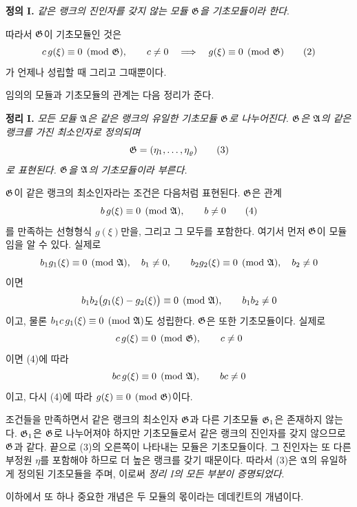 \medskip
\noindent\textbf{정의 I.} \emph{같은 랭크의 진인자를 갖지 않는 모듈 \(\mathfrak G\)을 기초모듈이라 한다}.

따라서 \(\mathfrak G\)이 기초모듈인 것은
\begin{equation}
c\,g(\xi)\equiv0\pmod{\mathfrak G},\qquad c\ne0
\quad\Longrightarrow\quad g(\xi)\equiv0\pmod{\mathfrak G}
\tag{2}
\end{equation}
가 언제나 성립할 때 그리고 그때뿐이다.

임의의 모듈과 기초모듈의 관계는 다음 정리가 준다.

\medskip
\noindent\textbf{정리 I.} \emph{모든 모듈 \(\mathfrak A\)은 같은 랭크의 유일한 기초모듈 \(\mathfrak G\)로 나누어진다. \(\mathfrak G\)은 \(\mathfrak A\)의 같은 랭크를 가진 최소인자로 정의되며
\begin{equation}
\mathfrak G=(\eta_1,\ldots,\eta_\varrho)
\tag{3}
\end{equation}
로 표현된다. \(\mathfrak G\)을 \(\mathfrak A\)의 기초모듈이라 부른다.}

\(\mathfrak G\)이 같은 랭크의 최소인자라는 조건은 다음처럼 표현된다. \(\mathfrak G\)은 관계
\begin{equation}
b\,g(\xi)\equiv0\pmod{\mathfrak A},\qquad b\ne0
\tag{4}
\end{equation}
를 만족하는 선형형식 \(g(\xi)\)만을, 그리고 그 모두를 포함한다. 여기서 먼저 \(\mathfrak G\)이 모듈임을 알 수 있다. 실제로
\[
b_1g_1(\xi)\equiv0\pmod{\mathfrak A},\quad b_1\ne0,\qquad
b_2g_2(\xi)\equiv0\pmod{\mathfrak A},\quad b_2\ne0
\]
이면
\[
b_1b_2\bigl(g_1(\xi)-g_2(\xi)\bigr)\equiv0\pmod{\mathfrak A},
\qquad b_1b_2\ne0
\]
이고, 물론 \(b_1c\,g_1(\xi)\equiv0\pmod{\mathfrak A}\)도 성립한다. \(\mathfrak G\)은 또한 기초모듈이다. 실제로
\[
c\,g(\xi)\equiv0\pmod{\mathfrak G},\qquad c\ne0
\]
이면 (4)에 따라
\[
bc\,g(\xi)\equiv0\pmod{\mathfrak A},\qquad bc\ne0
\]
이고, 다시 (4)에 따라 \(g(\xi)\equiv0\pmod{\mathfrak G}\)이다.

조건들을 만족하면서 같은 랭크의 최소인자 \(\mathfrak G\)과 다른 기초모듈 \(\mathfrak G_1\)은 존재하지 않는다. \(\mathfrak G_1\)은 \(\mathfrak G\)로 나누어져야 하지만 기초모듈로서 같은 랭크의 진인자를 갖지 않으므로 \(\mathfrak G\)과 같다. 끝으로 (3)의 오른쪽이 나타내는 모듈은 기초모듈이다. 그 진인자는 또 다른 부정원 \(\eta\)를 포함해야 하므로 더 높은 랭크를 갖기 때문이다. 따라서 (3)은 \(\mathfrak A\)의 유일하게 정의된 기초모듈을 주며, 이로써 \emph{정리 I의 모든 부분이 증명되었다}.

이하에서 또 하나 중요한 개념은 두 모듈의 몫이라는 데데킨트의 개념이다.

